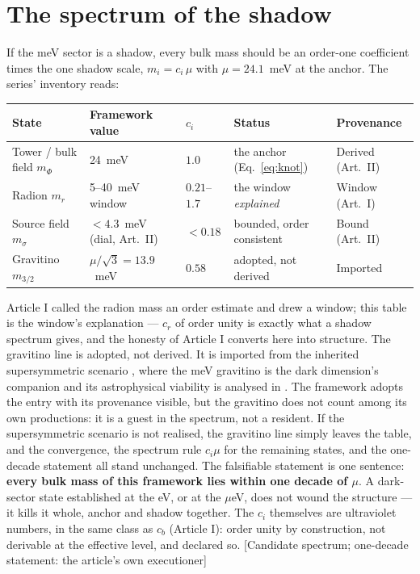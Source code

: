 \section{The spectrum of the shadow}
If the meV sector is a shadow, every bulk mass should be an order-one coefficient times the one shadow scale, $m_{i}=c_{i}\,\mu$ with $\mu=24.1$~meV at the anchor. The series' inventory reads:
\begin{center}\small
\begin{tabular}{lllll}
\toprule
\textbf{State} & \textbf{Framework value} & $c_{i}$ & \textbf{Status} & \textbf{Provenance}\\
\midrule
Tower / bulk field $m_{\Phi}$ & 24~meV & $1.0$ & the anchor (Eq.~\ref{eq:knot}) & Derived (Art.~II)\\
Radion $m_{r}$ & 5--40~meV window & $0.21$--$1.7$ & the window \emph{explained} & Window (Art.~I)\\
Source field $m_{\sigma}$ & $<4.3$~meV (dial, Art.~II) & $<0.18$ & bounded, order consistent & Bound (Art.~II)\\
Gravitino $m_{3/2}$ & $\mu/\sqrt{3}=13.9$~meV & $0.58$ & adopted, not derived & Imported \cite{AAL,CPV}\\
\bottomrule
\end{tabular}
\end{center}
Article I called the radion mass an order estimate and drew a window; this table is the window's explanation --- $c_{r}$ of order unity is exactly what a shadow spectrum gives, and the honesty of Article I converts here into structure. The gravitino line is adopted, not derived. It is imported from the inherited supersymmetric scenario \cite{AAL,CPV}, where the meV gravitino is the dark dimension's companion and its astrophysical viability is analysed in \cite{CPV}. The framework adopts the entry with its provenance visible, but the gravitino does not count among its own productions: it is a guest in the spectrum, not a resident. If the supersymmetric scenario is not realised, the gravitino line simply leaves the table, and the convergence, the spectrum rule $c_{i}\mu$ for the remaining states, and the one-decade statement all stand unchanged. The falsifiable statement is one sentence: \textbf{every bulk mass of this framework lies within one decade of $\mu$}. A dark-sector state established at the eV, or at the $\mu$eV, does not wound the structure --- it kills it whole, anchor and shadow together. The $c_{i}$ themselves are ultraviolet numbers, in the same class as $c_{b}$ (Article I): order unity by construction, not derivable at the effective level, and declared so. [Candidate spectrum; one-decade statement: the article's own executioner]

